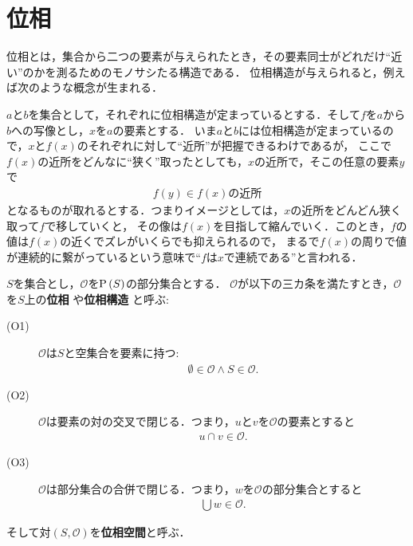 \section{位相}
	位相とは，集合から二つの要素が与えられたとき，その要素同士がどれだけ``近い''のかを測るためのモノサシたる構造である．
	位相構造が与えられると，例えば次のような概念が生まれる．
	
	$a$と$b$を集合として，それぞれに位相構造が定まっているとする．そして$f$を$a$から$b$への写像とし，$x$を$a$の要素とする．
	いま$a$と$b$には位相構造が定まっているので，$x$と$f(x)$のそれぞれに対して``近所''が把握できるわけであるが，
	ここで$f(x)$の近所をどんなに``狭く''取ったとしても，$x$の近所で，そこの任意の要素$y$で
	\begin{align}
		f(y) \in \mbox{$f(x)$の近所}
	\end{align}
	となるものが取れるとする．つまりイメージとしては，$x$の近所をどんどん狭く取って$f$で移していくと，
	その像は$f(x)$を目指して縮んでいく．このとき，$f$の値は$f(x)$の近くでズレがいくらでも抑えられるので，
	まるで$f(x)$の周りで値が連続的に繋がっているという意味で``$f$は$x$で連続である''と言われる．
	
	\begin{screen}
		\begin{dfn}[位相]
			$S$を集合とし，$\mathscr{O}$を$\operatorname*{P} \left(S\right)$の部分集合とする．
			$\mathscr{O}$が以下の三カ条を満たすとき，$\mathscr{O}$を$S$上の{\bf 位相}
			や{\bf 位相構造}
			と呼ぶ:
			\begin{description}
				\item[(O1)] $\mathscr{O}$は$S$と空集合を要素に持つ:
					\begin{align}
						\emptyset \in \mathscr{O} \wedge S \in \mathscr{O}.
					\end{align}
				\item[(O2)] $\mathscr{O}$は要素の対の交叉で閉じる．つまり，$u$と$v$を$\mathscr{O}$の要素とすると
					\begin{align}
						u \cap v \in \mathscr{O}.
					\end{align}
				\item[(O3)] $\mathscr{O}$は部分集合の合併で閉じる．つまり，$w$を$\mathscr{O}$の部分集合とすると
					\begin{align}
						\bigcup w \in \mathscr{O}.
					\end{align}
			\end{description}
			そして対$(S,\mathscr{O})$を{\bf 位相空間}と呼ぶ．
		\end{dfn}
	\end{screen}
	
